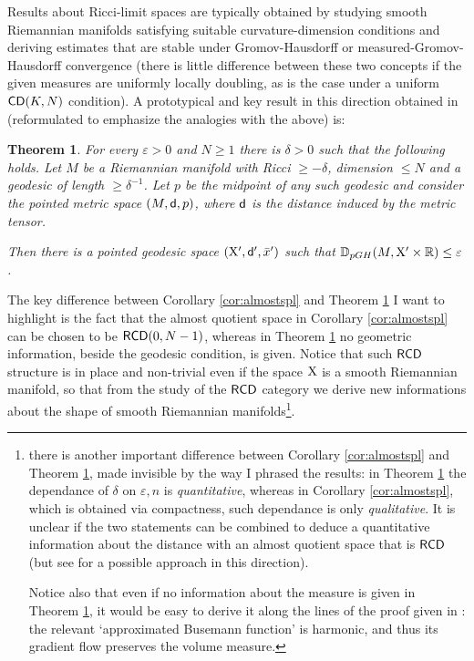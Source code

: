 \documentclass[11pt]{article}
\numberwithin{equation}{section}
\newtheorem{theorem}{Theorem}[section]
\newcommand{\R}{\mathbb{R}}
\newcommand{\X}{{\rm X}}
\newcommand{\sfd}{{\sf d}}
\newcommand{\CD}{{\sf CD}}
\newcommand{\RCD}{{\sf RCD}}
\newcommand{\eps}{\varepsilon}
\begin{document}
Results about Ricci-limit spaces are typically obtained by studying smooth Riemannian manifolds satisfying suitable curvature-dimension conditions and deriving estimates that are stable under Gromov-Hausdorff or measured-Gromov-Hausdorff convergence (there is little difference between these two concepts if the given measures are uniformly locally doubling, as is the case under a uniform $\CD(K,N)$ condition). A prototypical and key result in this direction obtained in \cite{Cheeger-Colding96}  (reformulated to emphasize the analogies with the above) is:
\begin{theorem}\label{thm:riccilim}  For every $\eps>0$ and $N\geq 1$ there is $\delta>0$ such that the following holds.  Let $M$ be a   Riemannian manifold with   Ricci $\geq -\delta$, dimension $\leq N$  and  a geodesic of length $\geq\delta^{-1}$. Let $p$ be the midpoint of any such geodesic and consider the pointed metric  space $(M,\sfd,p)$, where $\sfd$ is the distance induced by the metric tensor.

Then there is a pointed geodesic space $(\X',\sfd',\bar x')$ such that  $\mathbb D_{pGH}(M,\X'\times\R)\leq \eps$.
\end{theorem}
The key difference between Corollary \ref{cor:almostspl} and Theorem \ref{thm:riccilim} I want to highlight is the fact that the almost quotient space in Corollary \ref{cor:almostspl} can be chosen to be $\RCD(0,N-1)$, whereas in Theorem \ref{thm:riccilim} no geometric information, beside the geodesic condition, is given. Notice that such $\RCD$ structure is in place and non-trivial even if the space $\X$ is a smooth Riemannian manifold, so that from the study of the $\RCD$ category we derive new informations about the shape of smooth Riemannian manifolds\footnote{there is another important difference between  Corollary \ref{cor:almostspl} and Theorem \ref{thm:riccilim}, made invisible by the way I phrased the results: in  Theorem \ref{thm:riccilim} the dependance of $\delta$ on $\eps,n$ is \emph{quantitative}, whereas in Corollary \ref{cor:almostspl}, which is obtained via compactness, such dependance is only \emph{qualitative}. It is unclear if the two statements can be combined to deduce a quantitative information about the distance with an almost quotient space that is $\RCD$ (but see \cite[Theorem 4.1]{ColdMin14} for a possible approach in this direction).

Notice also that even if no information about the measure is given in Theorem \ref{thm:riccilim}, it would be easy to derive it along the lines of the proof given in \cite{Cheeger-Colding96}: the relevant `approximated Busemann function' is harmonic, and thus its gradient flow preserves the volume measure.}.
\end{document}
